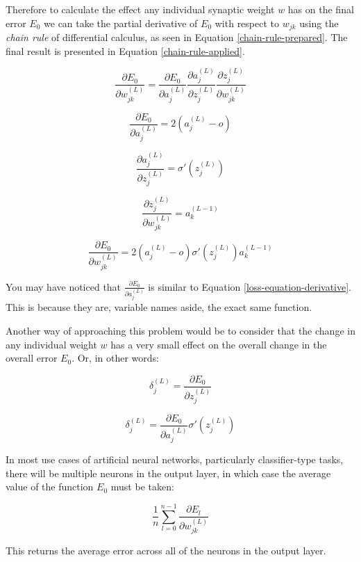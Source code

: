 \documentclass[12pt]{article}
\begin{document}
        Therefore to calculate the effect any individual synaptic weight $w$ has on the final error $E_0$ we can take the partial derivative of $E_0$ with respect to $w_{jk}$ using the \textit{chain rule} of differential calculus, as seen in Equation \ref{chain-rule-prepared}. The final result is presented in Equation \ref{chain-rule-applied}.

        \begin{equation} \label{chain-rule-prepared}
            \frac{\partial E_0}{\partial w_{jk}^{(L)}} = \frac{\partial E_0}{\partial a_j^{(L)}}  \frac{\partial a_j^{(L)}}{\partial z_j^{(L)}} \frac{\partial z_j^{(L)}}{\partial w_{jk}^{(L)}}
        \end{equation}

            \[ \frac{\partial E_0}{\partial a_j^{(L)}} = 2 (a_j^{(L)} - o)\]

            \[ \frac{\partial a_j^{(L)}}{\partial z_j^{(L)}} = \sigma '(z_j^{(L)}) \]

            \[ \frac{\partial z_j^{(L)}}{\partial w_{jk}^{(L)}} = a_k^{(L-1)}\]

            \begin{equation} \label{chain-rule-applied}
                \frac{\partial E_0}{\partial w_{jk}^{(L)}} = 2 (a_j^{(L)} - o) \sigma '(z_j^{(L)}) a_k^{(L-1)}
            \end{equation}

        You may have noticed that $\frac{\partial E_0}{\partial a_j^{(L)}}$ is similar to Equation \ref{loss-equation-derivative}. This is because they are, variable names aside, the exact same function.

        Another way of approaching this problem would be to consider that the change in any individual weight $w$ has a very small effect on the overall change in the overall error $E_0$. Or, in other words:

        \[ \delta_{j}^{(L)} = \frac{\partial E_0}{\partial z_j^{(L)}} \]

        \[ \delta_j^{(L)} = \frac{\partial E_0}{\partial a_j^{(L)}} \sigma '(z_j^{(L)})\]

        In most use cases of artificial neural networks, particularly classifier-type tasks, there will be multiple neurons in the output layer, in which case the average value of the function $E_0$ must be taken:

        \[ \frac{1}{n}\sum_{l=0}^{n-1} \frac{\partial E_l}{\partial w_{jk}^{(L)}}\]

        This returns the average error across all of the neurons in the output layer.
\end{document}
